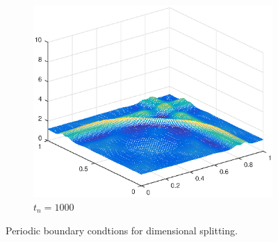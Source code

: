 \begin{figure}[h!]
\begin{subfigure}[t]{0.48\textwidth}
        \includegraphics[width=\textwidth]{images/sol_ri_1000_per.eps}
        \caption{$t_{n}=1000$}
        \label{fig:100}
    \end{subfigure}
    \caption{Periodic boundary condtions for dimensional splitting.}
    \label{fig:2DSolutions_ri}
\end{figure}
